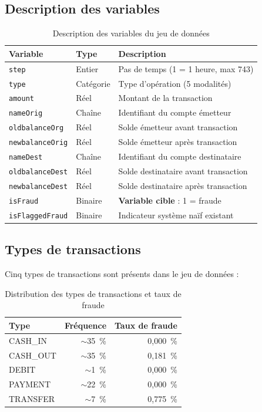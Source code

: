 \documentclass[12pt,a4paper,twoside]{report}
\begin{document}
\subsection{Description des variables}

\begin{table}[H]
\centering
\caption{Description des variables du jeu de données}
\label{tab:variables}
\begin{tabular}{lll}
\toprule
\textbf{Variable}        & \textbf{Type}  & \textbf{Description} \\
\midrule
\texttt{step}            & Entier    & Pas de temps (1 = 1 heure, max 743) \\
\texttt{type}            & Catégorie & Type d'opération (5 modalités) \\
\texttt{amount}          & Réel      & Montant de la transaction \\
\texttt{nameOrig}        & Chaîne    & Identifiant du compte émetteur \\
\texttt{oldbalanceOrg}   & Réel      & Solde émetteur avant transaction \\
\texttt{newbalanceOrig}  & Réel      & Solde émetteur après transaction \\
\texttt{nameDest}        & Chaîne    & Identifiant du compte destinataire \\
\texttt{oldbalanceDest}  & Réel      & Solde destinataire avant transaction \\
\texttt{newbalanceDest}  & Réel      & Solde destinataire après transaction \\
\texttt{isFraud}         & Binaire   & \textbf{Variable cible} : 1 = fraude \\
\texttt{isFlaggedFraud}  & Binaire   & Indicateur système naïf existant \\
\bottomrule
\end{tabular}
\end{table}

\subsection{Types de transactions}

Cinq types de transactions sont présents dans le jeu de données :

\begin{table}[H]
\centering
\caption{Distribution des types de transactions et taux de fraude}
\label{tab:types_transactions}
\begin{tabular}{lrr}
\toprule
\textbf{Type}  & \textbf{Fréquence} & \textbf{Taux de fraude} \\
\midrule
CASH\_IN       & $\sim$35~\% & 0,000~\% \\
CASH\_OUT      & $\sim$35~\% & 0,181~\% \\
DEBIT          & $\sim$1~\%  & 0,000~\% \\
PAYMENT        & $\sim$22~\% & 0,000~\% \\
TRANSFER       & $\sim$7~\%  & 0,775~\% \\
\bottomrule
\end{tabular}
\end{table}
\end{document}
